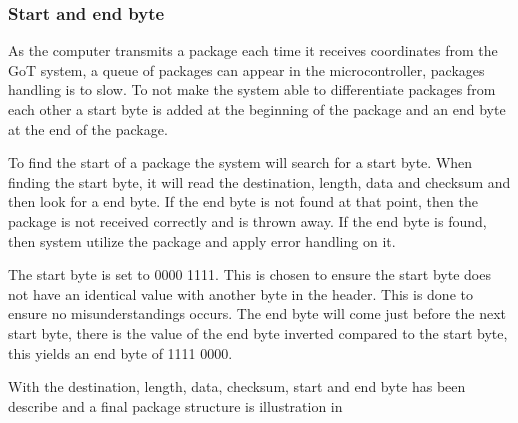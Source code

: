 \subsubsection{Start and end byte}
As the computer transmits a package each time it receives coordinates from the GoT system, a queue of packages can appear in the microcontroller, packages handling is to slow. To not make the system able to differentiate packages from each other a start byte is added at the beginning of the package and an end byte at the end of the package. 

To find the start of a package the system will search for a start byte. When finding the start byte, it will read the destination, length, data and checksum and then look for a end byte. If the end byte is not found at that point, then the package is not received correctly and is thrown away. If the end byte is found, then system utilize the package and apply error handling on it. 

The start byte is set to 0000 1111. This is chosen to ensure the start byte does not have an identical value with another byte in the header. This is done to ensure no misunderstandings occurs. The end byte will come just before the next start byte, there is the value of the end byte inverted compared to the start byte, this yields an end byte of 1111 0000.

With the destination, length, data, checksum, start and end byte has been describe and a final package structure is illustration in 

